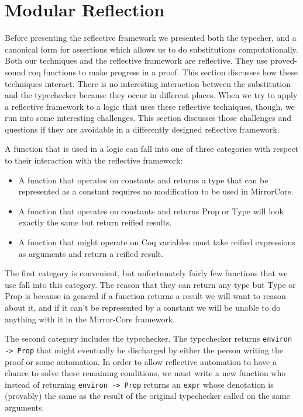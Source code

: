 \documentclass{puthesis}
\begin{document}
\section{Modular Reflection}

Before presenting the reflective framework we presented both the typecher,
and a canonical form for assertions which allows us to do substitutions computationally.
Both our techniques and the reflective framework are reflective.
They use proved-sound coq functions to make progress in a proof. This
section discusses how these techniques interact. There
is no interesting interaction between the substitution and the
typechecker because they occur in different places. When we try
to apply a reflective framework to a logic that uses these reflective
techniques, though, we run into some interesting challenges. This
section discusses those challenges and questions if they are 
avoidable in a differently designed reflective framework.

A function that is used in a logic can fall into one of
three categories with respect to their interaction
with the reflective framework:

\begin{itemize}
  \item A function that operates on constants and returns a type that can be represented as a constant
    requires no modification to be used in MirrorCore.
  \item A function that operates on constants and returns Prop or Type will look exactly
    the same but return reified results.
  \item A function that might operate on Coq variables must take reified expressions as 
    arguments and return a reified result.
\end{itemize}

The first category is convenient, but unfortunately fairly few functions that
we use fall into this category. The reason that they can return any
type but Type or Prop is because in general if a function returns a result we
will want to reason about it, and if it can't be represented by a constant
we will be unable to do anything with it in the Mirror-Core framework.

The second category includes the typechecker. The typechecker returns
\lstinline|environ -> Prop| that might eventually be discharged
by either the person writing the proof or some automation. 
In order to allow reflective automation to have a chance to solve these remaining
conditions, we must write a new function who instead of returning
\lstinline|environ -> Prop| returns an \lstinline|expr| whose denotation
is (provably) the same as the result of the original typechecker called
on the same arguments. 
\end{document}
